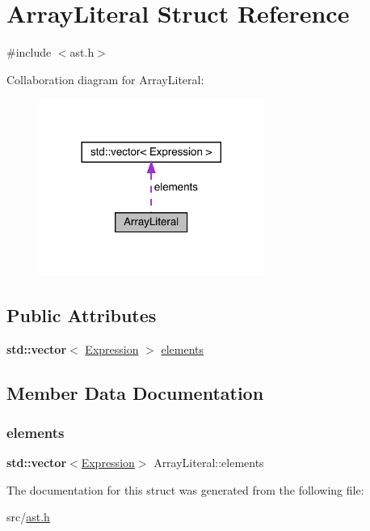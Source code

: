 \hypertarget{struct_array_literal}{}\section{Array\+Literal Struct Reference}
\label{struct_array_literal}


{\ttfamily \#include $<$ast.\+h$>$}



Collaboration diagram for Array\+Literal\+:\nopagebreak
\begin{figure}[H]
\begin{center}
\leavevmode
\includegraphics[width=209pt]{struct_array_literal__coll__graph}
\end{center}
\end{figure}
\subsection*{Public Attributes}
\begin{DoxyCompactItemize}
\item 
\textbf{ std\+::vector}$<$ \hyperlink{ast_8h_a4cb273a4d960cd13ea17d08f254493e8}{Expression} $>$ \hyperlink{struct_array_literal_a781458884800ef73f725cbc92c5cc35c}{elements}
\end{DoxyCompactItemize}


\subsection{Member Data Documentation}
\mbox{\label{struct_array_literal_a781458884800ef73f725cbc92c5cc35c}} 
\subsubsection{\texorpdfstring{elements}{elements}}
{\footnotesize\ttfamily \textbf{ std\+::vector}$<$\hyperlink{ast_8h_a4cb273a4d960cd13ea17d08f254493e8}{Expression}$>$ Array\+Literal\+::elements}



The documentation for this struct was generated from the following file\+:\begin{DoxyCompactItemize}
\item 
src/\hyperlink{ast_8h}{ast.\+h}\end{DoxyCompactItemize}
